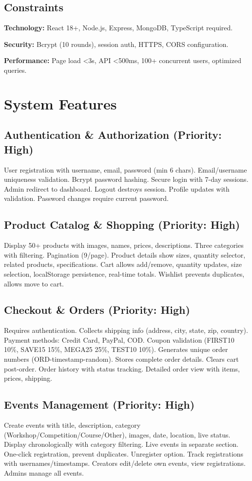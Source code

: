 ﻿\documentclass[11pt]{article}
\begin{document}
\subsection{Constraints}
\textbf{Technology:} React 18+, Node.js, Express, MongoDB, TypeScript required.

\textbf{Security:} Bcrypt (10 rounds), session auth, HTTPS, CORS configuration.

\textbf{Performance:} Page load <3s, API <500ms, 100+ concurrent users, optimized queries.

\section{System Features}

\subsection{Authentication \& Authorization (Priority: High)}
User registration with username, email, password (min 6 chars). Email/username uniqueness validation. Bcrypt password hashing. Secure login with 7-day sessions. Admin redirect to dashboard. Logout destroys session. Profile updates with validation. Password changes require current password.

\subsection{Product Catalog \& Shopping (Priority: High)}
Display 50+ products with images, names, prices, descriptions. Three categories with filtering. Pagination (9/page). Product details show sizes, quantity selector, related products, specifications. Cart allows add/remove, quantity updates, size selection, localStorage persistence, real-time totals. Wishlist prevents duplicates, allows move to cart.

\subsection{Checkout \& Orders (Priority: High)}
Requires authentication. Collects shipping info (address, city, state, zip, country). Payment methods: Credit Card, PayPal, COD. Coupon validation (FIRST10 10\%, SAVE15 15\%, MEGA25 25\%, TEST10 10\%). Generates unique order numbers (ORD-timestamp-random). Stores complete order details. Clears cart post-order. Order history with status tracking. Detailed order view with items, prices, shipping.

\subsection{Events Management (Priority: High)}
Create events with title, description, category (Workshop/Competition/Course/Other), images, date, location, live status. Display chronologically with category filtering. Live events in separate section. One-click registration, prevent duplicates. Unregister option. Track registrations with usernames/timestamps. Creators edit/delete own events, view registrations. Admins manage all events.
\end{document}
